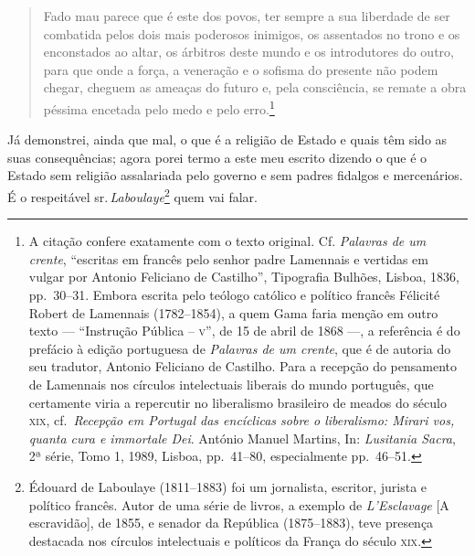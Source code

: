 \begin{quote}
Fado mau parece que é este dos povos, ter sempre a sua liberdade de ser
combatida pelos dois mais poderosos inimigos, os assentados no trono e
os enconstados ao altar, os árbitros deste mundo e os introdutores do
outro, para que onde a força, a veneração e o sofisma do presente não
podem chegar, cheguem as ameaças do futuro e, pela consciência, se
remate a obra péssima encetada pelo medo e pelo erro.\footnote{A
  citação confere exatamente com o texto original. Cf. \emph{Palavras de
  um crente}, ``escritas em francês pelo senhor padre Lamennais e
  vertidas em vulgar por Antonio Feliciano de Castilho'', Tipografia
  Bulhões, Lisboa, 1836, pp.~30--31. Embora escrita pelo teólogo católico
  e político francês Félicité Robert de Lamennais (1782--1854), a quem
  Gama faria menção em outro texto --- ``Instrução Pública -- \textsc{v}'', de
  15 de abril de 1868 ---, a referência é do prefácio à edição portuguesa de
  \emph{Palavras de um crente}, que é de autoria do seu tradutor,
  Antonio Feliciano de Castilho. Para a recepção do pensamento de
  Lamennais nos círculos intelectuais liberais do mundo português, que
  certamente viria a repercutir no liberalismo brasileiro de meados do
  século \textsc{xix}, cf.~\emph{Recepção em Portugal das encíclicas sobre o
  liberalismo: Mirari vos, quanta cura e immortale Dei}. António Manuel
  Martins, In: \emph{Lusitania Sacra}, 2ª série, Tomo 1, 1989, Lisboa,
  pp.~41--80, especialmente pp.~46--51.}
\end{quote}

Já demonstrei, ainda que mal, o que é a religião de Estado e quais têm
sido as suas consequências; agora porei termo a este meu escrito dizendo
o que é o Estado sem religião assalariada pelo governo e sem padres
fidalgos e mercenários. É o respeitável sr.\,\emph{Laboulaye}\footnote{
  Édouard de Laboulaye (1811--1883) foi um jornalista, escritor, jurista
  e político francês. Autor de uma série de livros, a exemplo de
  \emph{L'Esclavage} {[}A escravidão{]}, de 1855, e senador da
  República (1875--1883), teve presença destacada nos círculos
  intelectuais e políticos da França do século \textsc{xix}.} quem vai falar.


